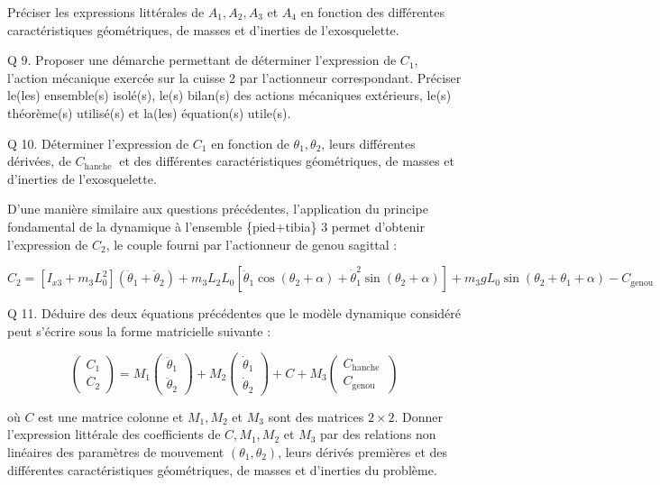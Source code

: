 Préciser les expressions littérales de $A_{1}, A_{2}, A_{3}$ et $A_{4}$ en fonction des différentes caractéristiques géométriques, de masses et d'inerties de l'exosquelette.

Q 9. Proposer une démarche permettant de déterminer l'expression de $C_{1}$, l'action mécanique exercée sur la cuisse 2 par l'actionneur correspondant. Préciser le(les) ensemble(s) isolé(s), le(s) bilan(s) des actions mécaniques extérieurs, le(s) théorème(s) utilisé(s) et la(les) équation(s) utile(s).

Q 10. Déterminer l'expression de $C_{1}$ en fonction de $\theta_{1}, \theta_{2}$, leurs différentes dérivées, de $C_{\text {hanche }}$ et des différentes caractéristiques géométriques, de masses et d'inerties de l'exosquelette.

D'une manière similaire aux questions précédentes, l'application du principe fondamental de la dynamique à l'ensemble \{pied+tibia\} 3 permet d'obtenir l'expression de $C_{2}$, le couple fourni par l'actionneur de genou sagittal :

$$
C_{2}=\left[I_{x 3}+m_{3} L_{0}^{2}\right]\left(\ddot{\theta}_{1}+\ddot{\theta}_{2}\right)+m_{3} L_{2} L_{0}\left[\ddot{\theta}_{1} \cos \left(\theta_{2}+\alpha\right)+\dot{\theta}_{1}^{2} \sin \left(\theta_{2}+\alpha\right)\right]+m_{3} g L_{0} \sin \left(\theta_{2}+\theta_{1}+\alpha\right)-C_{\text {genou }}
$$

Q 11. Déduire des deux équations précédentes que le modèle dynamique considéré peut s'écrire sous la forme matricielle suivante :

$$
\left(\begin{array}{l}
C_{1} \\
C_{2}
\end{array}\right)=M_{1}\left(\begin{array}{c}
\ddot{\theta}_{1} \\
\ddot{\theta}_{2}
\end{array}\right)+M_{2}\left(\begin{array}{c}
\dot{\theta}_{1} \\
\dot{\theta}_{2}
\end{array}\right)+C+M_{3}\left(\begin{array}{c}
C_{\text {hanche }} \\
C_{\text {genou }}
\end{array}\right)
$$

où $C$ est une matrice colonne et $M_{1}, M_{2}$ et $M_{3}$ sont des matrices $2 \times 2$. Donner l'expression littérale des coefficients de $C, M_{1}, M_{2}$ et $M_{3}$ par des relations non linéaires des paramètres de mouvement $\left(\theta_{1}, \theta_{2}\right)$, leurs dérivés premières et des différentes caractéristiques géométriques, de masses et d'inerties du problème.
